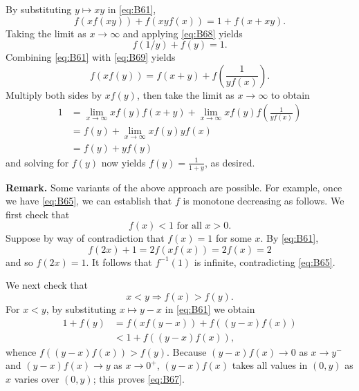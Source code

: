 \documentclass[amssymb,twocolumn,pra,10pt,aps]{revtex4-1}
\begin{document}
\begin{itemize}
By substituting $y \mapsto xy$ in \eqref{eq:B61},
\[
f(xf(xy)) + f(xyf(x)) = 1 + f(x+xy).
\]
Taking the limit as $x \to \infty$ and applying \eqref{eq:B68} yields
\begin{equation} \label{eq:B69}
f(1/y) + f(y) = 1.
\end{equation}
Combining  \eqref{eq:B61} with \eqref{eq:B69} yields
\[
f(xf(y))=f(x+y)+f \left( \frac{1}{yf(x)} \right).
\]
Multiply both sides by $xf(y)$, then take the limit as $x \to \infty$ to obtain
\begin{align*}
1 &= \lim_{x \to \infty} xf(y) f(x+y) + \lim_{x \to \infty} xf(y) 
f\left( \frac{1}{yf(x)} \right) \\
&= f(y) + \lim_{x \to \infty} xf(y) yf(x) \\
&= f(y) + yf(y)
\end{align*}
and solving for $f(y)$ now yields $f(y) = \frac{1}{1+y}$, as desired.

\noindent
\textbf{Remark.}
Some variants of the above approach are possible. For example,
once we have \eqref{eq:B65}, we can establish that $f$ is monotone decreasing as follows. We first check that
\begin{equation} \label{eq:B66}
f(x) < 1 \mbox{ for all } x > 0.
\end{equation}
Suppose by way of contradiction that $f(x) = 1$ for some $x$.
By \eqref{eq:B61},
\[
f(2x) + 1 = 2f(xf(x)) = 2f(x) = 2
\]
and so $f(2x) = 1$. It follows that $f^{-1}(1)$ is infinite, contradicting \eqref{eq:B65}.


We next check that
\begin{equation} \label{eq:B67}
x<y \Longrightarrow f(x) > f(y).
\end{equation}
For $x < y$, by substituting $x \mapsto y-x$ in \eqref{eq:B61} we obtain
\begin{align*}
1+f(y) &= f(xf(y-x)) + f((y-x)f(x)) \\
&< 1 + f((y-x)f(x)),
\end{align*}
whence $f((y-x)f(x))> f(y)$. Because $(y-x)f(x) \to 0$ as $x \to y^-$ and $(y-x)f(x) \to y$ as $x \to 0^+$, $(y-x)f(x)$ takes all values in $(0,y)$ as $x$ varies over $(0,y)$; this proves \eqref{eq:B67}.


\end{itemize}
\end{document}
